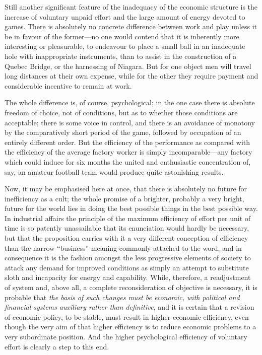 \documentclass{book}
\begin{document}
Still another significant feature of the inadequacy of the economic structure is the increase of voluntary unpaid effort and the large amount of energy devoted to games. There is absolutely no concrete difference between work and play unless it be in favour of the former—no one would contend that it is inherently more interesting or pleasurable, to endeavour to place a small ball in an inadequate hole with inappropriate instruments, than to assist in the construction of a Quebec Bridge, or the harnessing of Niagara. But for one object men will travel long distances at their own expense, while for the other they require payment and considerable incentive to remain at work.

The whole difference is, of course, psychological; in the one case there is absolute freedom of choice, not of conditions, but as to whether those conditions are acceptable; there is some voice in control, and there is an avoidance of monotony by the comparatively short period of the game, followed by occupation of an entirely different order. But the efficiency of the performance as compared with the efficiency of the average factory worker is simply incomparable—any factory which could induce for six months the united and enthusiastic concentration of, say, an amateur football team would produce quite astonishing results.

Now, it may be emphasised here at once, that there is absolutely no future for inefficiency as a cult; the whole promise of a brighter, probably a very bright, future for the world lies in doing the best possible things in the best possible way. In industrial affairs the principle of the maximum efficiency of effort per unit of time is so patently unassailable that its enunciation would hardly be necessary, but that the proposition carries with it a very different conception of efficiency than the narrow “business” meaning commonly attached to the word, and in consequence it is the fashion amongst the less progressive elements of society to attack any demand for improved conditions as simply an attempt to substitute sloth and incapacity for energy and capability. While, therefore, a readjustment of system and, above all, a complete reconsideration of objective is necessary, it is probable that \emph{the basis of such changes must be economic, with political and financial systems auxiliary rather than definitive}, and it is certain that a revision of economic policy, to be stable, must result in higher economic efficiency, even though the very aim of that higher efficiency is to reduce economic problems to a very subordinate position. And the higher psychological efficiency of voluntary effort is clearly a step to this end.
\end{document}
